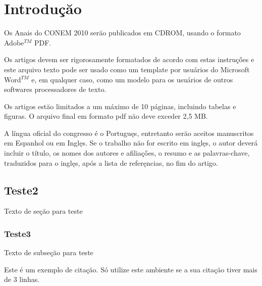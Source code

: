 \documentclass{ufscThesis}
\begin{document}
\capa  
\folhaderosto[comficha] %
\folhaaprovacao
\paginadedicatoria
\paginaagradecimento
\paginaepigrafe
\paginaresumo
\paginaabstract
\listadefiguras
\listadetabelas 
\listadeabreviaturas
\listadesimbolos
\sumario



\chapter{Introduçăo}
Os Anais do CONEM 2010 serăo publicados em CDROM, usando o formato Adobe$^{TM}$ PDF.

Os artigos devem ser rigorosamente formatados de acordo com estas instruçőes e este arquivo texto pode ser usado como um template por usuários do Microsoft Word$^{TM}$ e, em qualquer caso, como um modelo para os usuários de outros softwares processadores de texto.

Os artigos estăo limitados a um máximo de 10 páginas, incluindo tabelas e figuras. O arquivo final em formato pdf năo deve exceder 2,5 MB.

A língua oficial do congresso é o Portuguęs, entretanto serăo aceitos manuscritos em Espanhol ou em Inglęs. Se o trabalho năo for escrito em inglęs, o autor deverá incluir o título, os nomes dos autores e afiliaçőes, o resumo e as palavras-chave, traduzidos para o inglęs, após a lista de referęncias, no fim do artigo.

\section{Teste2}
Texto de seçăo para teste

\subsection{Teste3}
Texto de subseçăo para teste
\begin{citacao}
 Este é um exemplo de citaçăo. Só utilize este ambiente se
 a sua citaçăo tiver mais de 3 linhas.
\end{citacao}
\end{document}
